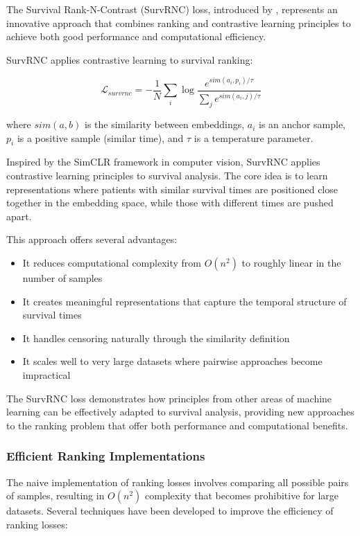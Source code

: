 The Survival Rank-N-Contrast (SurvRNC) loss, introduced by \textcite{kvamme2021survrnc}, represents an innovative approach that combines ranking and contrastive learning principles to achieve both good performance and computational efficiency.

\begin{definitionbox}[title=SurvRNC Loss]
  SurvRNC applies contrastive learning to survival ranking:

  \begin{equation}
    \mathcal{L}_{survrnc} = -\frac{1}{N} \sum_i \log \frac{e^{sim(a_i, p_i)/\tau}}{\sum_j e^{sim(a_i, j)/\tau}}
  \end{equation}

  where $sim(a,b)$ is the similarity between embeddings, $a_i$ is an anchor sample, $p_i$ is a positive sample (similar time), and $\tau$ is a temperature parameter.
\end{definitionbox}

Inspired by the SimCLR framework in computer vision, SurvRNC applies contrastive learning principles to survival analysis. The core idea is to learn representations where patients with similar survival times are positioned close together in the embedding space, while those with different times are pushed apart.

This approach offers several advantages:
\begin{itemize}
\item It reduces computational complexity from $O(n^2)$ to roughly linear in the number of samples
\item It creates meaningful representations that capture the temporal structure of survival times
\item It handles censoring naturally through the similarity definition
\item It scales well to very large datasets where pairwise approaches become impractical
\end{itemize}

The SurvRNC loss demonstrates how principles from other areas of machine learning can be effectively adapted to survival analysis, providing new approaches to the ranking problem that offer both performance and computational benefits.

\subsubsection{Efficient Ranking Implementations}

The naive implementation of ranking losses involves comparing all possible pairs of samples, resulting in $O(n^2)$ complexity that becomes prohibitive for large datasets. Several techniques have been developed to improve the efficiency of ranking losses:

